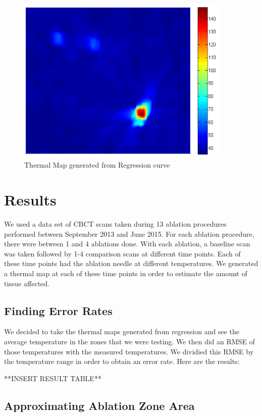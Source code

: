 \documentclass[]{spie}  %
\begin{document}
\begin{figure} 
\centering 
\includegraphics[width=4in]{slidingDiffThermalMap.png} 
\caption{Thermal Map generated from Regression curve} 
\end{figure}


\section{Results}

We used a data set of CBCT scans taken during 13 ablation procedures performed between September 2013 and June 2015. For each ablation procedure, there were between 1 and 4 ablations done. With each ablation, a baseline scan was taken followed by 1-4 comparison scans at different time points. Each of these time points had the ablation needle at different temperatures. We generated a thermal map at each of these time points in order to estimate the amount of tissue affected. 

\subsection{Finding Error Rates}

We decided to take the thermal maps generated from regression and see the average temperature in the zones that we were testing. We then did an RMSE of those temperatures with the measured temperatures. We dividied this RMSE by the temperature range in order to obtain an error rate. Here are the results:

**INSERT RESULT TABLE**

\subsection{Approximating Ablation Zone Area}
\end{document}
